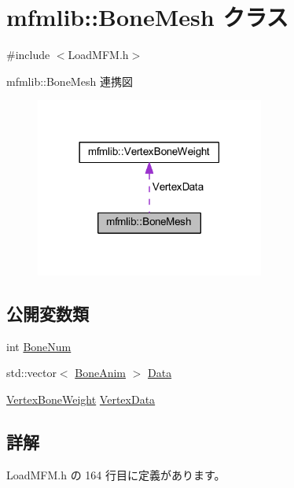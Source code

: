 \hypertarget{classmfmlib_1_1_bone_mesh}{}\section{mfmlib\+:\+:Bone\+Mesh クラス}
\label{classmfmlib_1_1_bone_mesh}


{\ttfamily \#include $<$Load\+M\+F\+M.\+h$>$}



mfmlib\+:\+:Bone\+Mesh 連携図\nopagebreak
\begin{figure}[H]
\begin{center}
\leavevmode
\includegraphics[width=213pt]{classmfmlib_1_1_bone_mesh__coll__graph}
\end{center}
\end{figure}
\subsection*{公開変数類}
\begin{DoxyCompactItemize}
\item 
int \mbox{\hyperlink{classmfmlib_1_1_bone_mesh_a56275d3c9a8cc5ca1026f6498b3bedc3}{Bone\+Num}}
\item 
std\+::vector$<$ \mbox{\hyperlink{classmfmlib_1_1_bone_anim}{Bone\+Anim}} $>$ \mbox{\hyperlink{classmfmlib_1_1_bone_mesh_a3ec6ff3ede0f20ad419500c80ce2e6c1}{Data}}
\item 
\mbox{\hyperlink{classmfmlib_1_1_vertex_bone_weight}{Vertex\+Bone\+Weight}} \mbox{\hyperlink{classmfmlib_1_1_bone_mesh_ab252d2d15dc2e927471943a33b19fbc4}{Vertex\+Data}}
\end{DoxyCompactItemize}


\subsection{詳解}


 Load\+M\+F\+M.\+h の 164 行目に定義があります。



